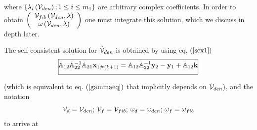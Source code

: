 where $\left\{ \lambda _{i}\left( {\cal V}_{den}\right) ;1\leq i\leq
m_{1}\right\} $ are arbitrary complex coefficients. In order to obtain $%
\left( 
\begin{array}{c}
{\cal V}_{fib}\left( {\cal V}_{den},\lambda \right) \\ 
\omega \left( {\cal V}_{den},\lambda \right)%
\end{array}%
\right) $ one must integrate this solution, which we discuss in depth later.

The self consistent solution for ${\cal \dot{V}}_{den}$ is obtained by using
eq. $\left( \ref{scx1}\right) $ 
\begin{equation}
\frame{$%
\mathrel{\mathop{\stackrel{}{{\Bbb A}_{12}{\Bbb A}_{22}^{-1}{\Bbb A}_{21}{\bf x}_{1\#\left( k+1\right) }={\Bbb A}_{12}{\Bbb A}_{22}^{-1}{\bf y}_{2}-{\bf y}_{1}+{\Bbb A}_{12}{\bf k}}}\limits_{}}%
$}
\end{equation}%
(which is equivalent to eq. $\left( \ref{gammaeq}\right) $ that implicitly
depends on ${\cal \dot{V}}_{den})$, and the notation 
\begin{equation}
{\cal V}_{d}={\cal V}_{den};\,{\cal V}_{f}={\cal V}_{fib};\,{\cal \omega }%
_{d}={\cal \omega }_{den};\,{\cal \omega }_{f}={\cal \omega }_{fib}
\end{equation}%
to arrive at 
